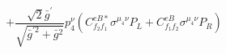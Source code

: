 %
\begin{dmath*}
%
  +  \frac{\sqrt{2} {\bar g}^\prime}{\sqrt{{\bar g}^{\prime 2} + {\bar g}{}^2}}p_4^{\nu} \left(C^{eB*}_{f_2 f_1} \sigma^{\mu_4 \nu } P_L  + C^{eB}_{f_1 f_2} \sigma^{\mu_4 \nu } P_R \right)
%
\end{dmath*}
%
